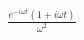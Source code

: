 \documentclass[preview]{standalone}
\begin{document}
\begin{align*}
\frac{e^{-i\omega t}(1+i\omega t)}{\omega^{2}}
\end{align*}
\end{document}

